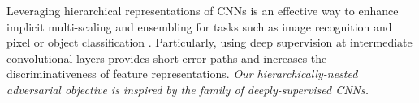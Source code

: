 \documentclass[10pt,twocolumn,letterpaper]{article}
\begin{document}

Leveraging hierarchical representations of CNNs is an effective way to enhance implicit multi-scaling and ensembling for tasks such as image recognition \cite{lee2015deeply} and pixel or object classification \cite{xie2015holistically,cai2016unified,long2015fully}. Particularly, using deep supervision \cite{lee2015deeply} at intermediate convolutional layers provides short error paths and increases the discriminativeness of feature representations. 
\textit{Our hierarchically-nested adversarial objective is inspired by the family of deeply-supervised CNNs.}

%
%
\end{document}
